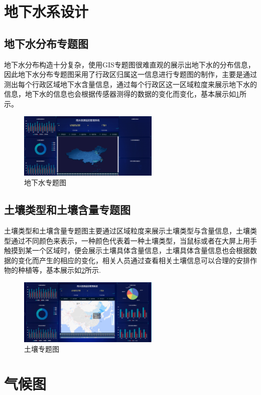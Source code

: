 \section{地下水系设计}
\subsection{地下水分布专题图}
地下水分布构造十分复杂，使用GIS专题图很难直观的展示出地下水的分布信息，因此地下水分布专题图采用了行政区归属这一信息进行专题图的制作，主要是通过测出每个行政区域地下水含量信息，通过每个行政区这一区域粒度来展示地下水的信息，地下水的信息也会根据传感器测得的数据的变化而变化，基本展示如\ref{fig:dixiashui}所示。
\begin{figure}[!htb]%
	\centering
	\includegraphics[width=0.60\textwidth]{figs/dixiashui.png}
	\caption{地下水专题图}
	\label{fig:dixiashui}
\end{figure}
\subsection{土壤类型和土壤含量专题图}
土壤类型和土壤含量专题图主要通过区域粒度来展示土壤类型与含量信息，土壤类型通过不同颜色来表示，一种颜色代表着一种土壤类型，当鼠标或者在大屏上用手触摸到某一个区域时，便会展示土壤具体含量信息，土壤具体含量信息也会根据数据的变化而产生的相应的变化，相关人员通过查看相关土壤信息可以合理的安排作物的种植等，基本展示如\ref{fig:turang}所示.
\begin{figure}[!htb]%
	\centering
	\includegraphics[width=0.60\textwidth]{figs/turang.png}
	\caption{土壤专题图}
	\label{fig:turang}
\end{figure}
\section{气候图}
